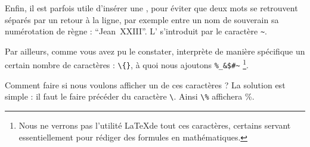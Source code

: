 Enfin, il est parfois utile d'insérer une , pour éviter que deux mots se retrouvent séparés par un retour à la ligne, par exemple entre un nom de souverain sa numérotation de règne : \enquote{Jean~XXIII}.  L' s'introduit par le caractère \verb|~|.












Par ailleurs, comme vous avez pu le constater, \logiciel{\LaTeX} interprète de manière spécifique un certain nombre de caractères : \verb|\{}|, à quoi nous ajoutons \verb|%_&$#~| \footnote{Nous ne verrons pas l'utilité \LaTeX de tout ces caractères, certains servant essentiellement pour rédiger des formules en mathématiques.}.

Comment faire si nous voulons afficher un de ces caractères ? La solution est simple : il faut le faire précéder du caractère \verb|\|. Ainsi \verb|\%| affichera \%.   





